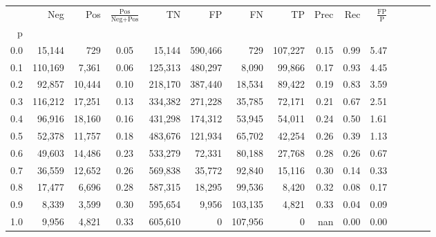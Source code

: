 \begin{tabular}{rrrcrrrrrrrrrrr}
\toprule
{} &      Neg &     Pos & $\frac{\text{Pos}}{\text{Neg}+\text{Pos}}$ &       TN &       FP &       FN &       TP &  Prec &   Rec & $\frac{\text{FP}}{\text{P}}$ \\
p   &          &         &                                            &          &          &          &          &       &       &                              \\
\midrule
0.0 &   15,144 &     729 &                                       0.05 &   15,144 &  590,466 &      729 &  107,227 &  0.15 &  0.99 &                         5.47 \\
0.1 &  110,169 &   7,361 &                                       0.06 &  125,313 &  480,297 &    8,090 &   99,866 &  0.17 &  0.93 &                         4.45 \\
0.2 &   92,857 &  10,444 &                                       0.10 &  218,170 &  387,440 &   18,534 &   89,422 &  0.19 &  0.83 &                         3.59 \\
0.3 &  116,212 &  17,251 &                                       0.13 &  334,382 &  271,228 &   35,785 &   72,171 &  0.21 &  0.67 &                         2.51 \\
0.4 &   96,916 &  18,160 &                                       0.16 &  431,298 &  174,312 &   53,945 &   54,011 &  0.24 &  0.50 &                         1.61 \\
0.5 &   52,378 &  11,757 &                                       0.18 &  483,676 &  121,934 &   65,702 &   42,254 &  0.26 &  0.39 &                         1.13 \\
0.6 &   49,603 &  14,486 &                                       0.23 &  533,279 &   72,331 &   80,188 &   27,768 &  0.28 &  0.26 &                         0.67 \\
0.7 &   36,559 &  12,652 &                                       0.26 &  569,838 &   35,772 &   92,840 &   15,116 &  0.30 &  0.14 &                         0.33 \\
0.8 &   17,477 &   6,696 &                                       0.28 &  587,315 &   18,295 &   99,536 &    8,420 &  0.32 &  0.08 &                         0.17 \\
0.9 &    8,339 &   3,599 &                                       0.30 &  595,654 &    9,956 &  103,135 &    4,821 &  0.33 &  0.04 &                         0.09 \\
1.0 &    9,956 &   4,821 &                                       0.33 &  605,610 &        0 &  107,956 &        0 &   nan &  0.00 &                         0.00 \\
\bottomrule
\end{tabular}
